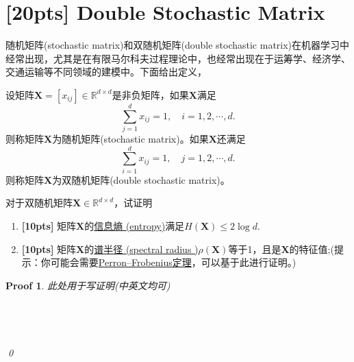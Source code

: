 \documentclass[a4paper,UTF8]{article}
\numberwithin{equation}{section}
\newtheorem*{myProof}{Proof}
\begin{document}
\newpage
\section{[20pts] Double Stochastic Matrix}
随机矩阵(stochastic matrix)和双随机矩阵(double stochastic matrix)在机器学习中经常出现，尤其是在有限马尔科夫过程理论中，也经常出现在于运筹学、经济学、交通运输等不同领域的建模中。下面给出定义，
\begin{def-box}[随机矩阵]
设矩阵$\mathbf{X}=[x_{ij}]\in \mathbb{R}^{d\times d}$是非负矩阵，如果$\mathbf{X}$满足
\begin{equation}
	\label{eq-sto-matrix}
	\sum_{j=1}^d x_{ij} = 1,\quad i=1,2,\cdots,d.
\end{equation}
则称矩阵$\mathbf{X}$为随机矩阵(stochastic matrix)。如果$\mathbf{X}$还满足
\begin{equation}
	\label{eq-double-sto-matrix}
	\sum_{i=1}^d x_{ij} = 1,\quad j=1,2,\cdots,d.
\end{equation}
则称矩阵$\mathbf{X}$为双随机矩阵(double stochastic matrix)。
\end{def-box}
对于双随机矩阵$\mathbf{X} \in \mathbb{R}^{d\times d}$，试证明
\begin{enumerate}[ {(}1{)}]
\item \textbf{[10pts]} 矩阵$\mathbf{X}$的\href{https://en.wikipedia.org/wiki/Entropy_(information_theory)}{信息熵 (entropy)}满足$H(\mathbf{X}) \leq 2\log d$.
\item \textbf{[10pts]} 矩阵$\mathbf{X}$的\href{https://en.wikipedia.org/wiki/Spectral_radius}{谱半径 (spectral radius
)}$\rho(\mathbf{X})$等于1，且是$\mathbf{X}$的特征值;(提示：你可能会需要\href{https://en.wikipedia.org/wiki/Perron%E2%80%93Frobenius_theorem}{Perron–Frobenius定理}，可以基于此进行证明。)
\end{enumerate}
\begin{myProof}
此处用于写证明(中英文均可)
~\\
~\\
~\\
~\\
~\\
\qed
\end{myProof}
\newpage
\end{document}
